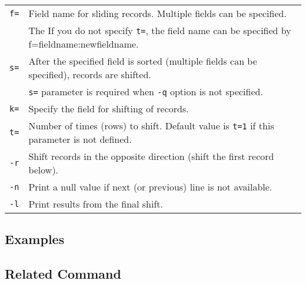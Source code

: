 \begin{table}[htbp]
{\small
\begin{tabular}{ll}
\verb|f=|    & Field name for sliding records. Multiple fields can be specified.  \\
             & The If you do not specify \verb|t=|, the field name can be specified by f=fieldname:newfieldname. \\
 \verb|s=|    & After the specified field is sorted (multiple fields can be specified), records are shifted.  \\
             & \verb|s=| parameter is required when \verb|-q| option is not specified. \\
\verb|k=|    & Specify the field for shifting of records. \\             
\verb|t=|    & Number of times (rows) to shift. Default value is \verb|t=1| if this parameter is not defined. \\
\verb|-r|    & Shift records in the opposite direction (shift the first record below).\\
\verb|-n|    & Print a null value if next (or previous) line is not available. \\
\verb|-l|    & Print results from the final shift.\\

\end{tabular} 
}
\end{table} 


\subsection*{Examples}


\subsection*{Related Command}


%
